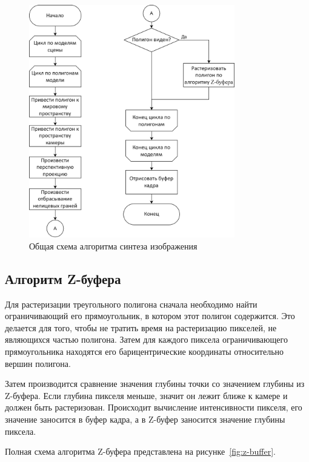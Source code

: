 \begin{figure}[h]
	\centering
	\includegraphics[width=0.8\textwidth]{img/algorithms/alg_scene.png}
	\caption{Общая схема алгоритма синтеза изображения}
	\label{fig:alg_scene}
\end{figure}

\clearpage

\subsection{Алгоритм Z-буфера}

Для растеризации треугольного полигона сначала необходимо найти ограничивающий его прямоугольник, в котором этот полигон содержится. 
Это делается для того, чтобы не тратить время на растеризацию пикселей, не являющихся частью полигона.
Затем для каждого пиксела ограничивающего прямоугольника находятся его барицентрические координаты относительно вершин полигона.

Затем производится сравнение значения глубины точки со значением глубины из Z-буфера. Если глубина пикселя меньше, значит он лежит ближе к камере и должен быть растеризован. Происходит вычисление интенсивности пикселя, его значение заносится в буфер кадра, а в Z-буфер заносится значение глубины пиксела.

Полная схема алгоритма Z-буфера представлена на  рисунке~\ref{fig:z-buffer}.

